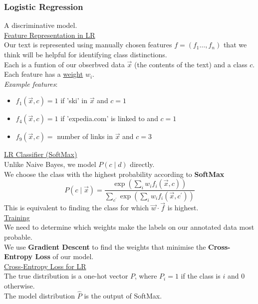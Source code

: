 \documentclass[8pt]{extarticle} %
\begin{document}
\begin{multicols*}{3}
\subsubsection*{Logistic Regression} 
A discriminative model. \\

\underline{Feature Representation in LR}\\
Our text is represented using manually chosen features $f=(f_1\dots,f_n)$ that we think will be helpful for identifying class distinctions.\\
Each is a funtion of our obserbved data $\vec{x}$ (the contents of the text) and a class $c$.\\
Each feature has a \underline{weight} $w_i$.\\

\textit{Example features}:
\begin{itemize}[label=\textbullet, labelsep=0.3em, leftmargin=0.5em, itemsep=0em]
    \item $f_1(\vec{x}, c)=1$ if 'ski' in $\vec{x}$ and $c=1$
    \item $f_4(\vec{x}, c)=1$ if 'expedia.com' is linked to and $c=1$
    \item $f_9(\vec{x}, c)=$ number of links in $\vec{x}$ and $c=3$
\end{itemize}

\underline{LR Classifier (SoftMax)}\\
Unlike Naive Bayes, we model $P(c \mid d)$ directly.\\
We choose the class with the highest probability according to \textbf{SoftMax}
$$
P(c \mid \vec{x})=\frac{\exp \left(\sum_i w_i f_i(\vec{x}, c)\right)}{\sum_{c^{\prime}} \exp \left(\sum_i w_i f_i\left(\vec{x}, c^{\prime}\right)\right)} 
$$
This is equivalent to finding the class for which $\vec{w} \cdot \vec{f}$ is highest.\\

\underline{Training}\\
We need to determine which weights make the labels on our annotated data most probable.\\
We use \textbf{Gradient Descent} to find the weights that minimise the \textbf{Cross-Entropy Loss} of our model.\\

\underline{Cross-Entropy Loss for LR}\\
The true distribution is a one-hot vector $P$, where $P_i=1$ if the class is $i$ and $0$ otherwise.\\
The model distribution $\hat{P}$ is the output of SoftMax.


\end{multicols*}
\end{document}
